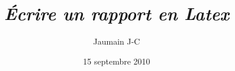 \documentclass[french, a4, 10pt]{article} %
\begin{document}
\lhead{ } %
\cfoot{ } %
\rfoot{\thepage} %
\renewcommand{\headrulewidth}{0.4pt} 
\renewcommand{\footrulewidth}{0.4pt} 
\setcounter{tocdepth}{1}    %
\setcounter{secnumdepth}{5} %
\title{\emph{\textbf{Écrire un rapport en Latex}}}
\author{Jaumain J-C}
\date{15 septembre 2010}
\maketitle
\tableofcontents






%
%
\printindex			%
\end{document}
